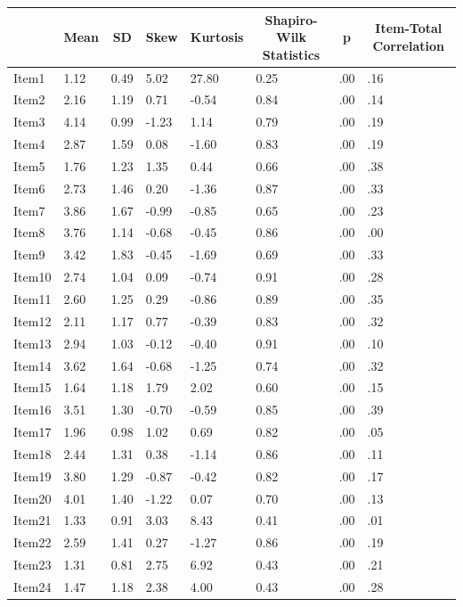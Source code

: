 \documentclass[
  english,
  man]{apa6}
\begin{document}
\begin{table}[tbp]
\begin{center}
\begin{threeparttable}
\begin{tabular}{llllllll}
\toprule
 & \multicolumn{1}{c}{Mean} & \multicolumn{1}{c}{SD} & \multicolumn{1}{c}{Skew} & \multicolumn{1}{c}{Kurtosis} & \multicolumn{1}{c}{Shapiro-Wilk Statistics} & \multicolumn{1}{c}{p} & \multicolumn{1}{c}{Item-Total Correlation}\\
\midrule
Item1 & 1.12 & 0.49 & 5.02 & 27.80 & 0.25 & .00 & .16\\
Item2 & 2.16 & 1.19 & 0.71 & -0.54 & 0.84 & .00 & .14\\
Item3 & 4.14 & 0.99 & -1.23 & 1.14 & 0.79 & .00 & .19\\
Item4 & 2.87 & 1.59 & 0.08 & -1.60 & 0.83 & .00 & .19\\
Item5 & 1.76 & 1.23 & 1.35 & 0.44 & 0.66 & .00 & .38\\
Item6 & 2.73 & 1.46 & 0.20 & -1.36 & 0.87 & .00 & .33\\
Item7 & 3.86 & 1.67 & -0.99 & -0.85 & 0.65 & .00 & .23\\
Item8 & 3.76 & 1.14 & -0.68 & -0.45 & 0.86 & .00 & .00\\
Item9 & 3.42 & 1.83 & -0.45 & -1.69 & 0.69 & .00 & .33\\
Item10 & 2.74 & 1.04 & 0.09 & -0.74 & 0.91 & .00 & .28\\
Item11 & 2.60 & 1.25 & 0.29 & -0.86 & 0.89 & .00 & .35\\
Item12 & 2.11 & 1.17 & 0.77 & -0.39 & 0.83 & .00 & .32\\
Item13 & 2.94 & 1.03 & -0.12 & -0.40 & 0.91 & .00 & .10\\
Item14 & 3.62 & 1.64 & -0.68 & -1.25 & 0.74 & .00 & .32\\
Item15 & 1.64 & 1.18 & 1.79 & 2.02 & 0.60 & .00 & .15\\
Item16 & 3.51 & 1.30 & -0.70 & -0.59 & 0.85 & .00 & .39\\
Item17 & 1.96 & 0.98 & 1.02 & 0.69 & 0.82 & .00 & .05\\
Item18 & 2.44 & 1.31 & 0.38 & -1.14 & 0.86 & .00 & .11\\
Item19 & 3.80 & 1.29 & -0.87 & -0.42 & 0.82 & .00 & .17\\
Item20 & 4.01 & 1.40 & -1.22 & 0.07 & 0.70 & .00 & .13\\
Item21 & 1.33 & 0.91 & 3.03 & 8.43 & 0.41 & .00 & .01\\
Item22 & 2.59 & 1.41 & 0.27 & -1.27 & 0.86 & .00 & .19\\
Item23 & 1.31 & 0.81 & 2.75 & 6.92 & 0.43 & .00 & .21\\
Item24 & 1.47 & 1.18 & 2.38 & 4.00 & 0.43 & .00 & .28\\

\end{tabular}
\end{threeparttable}
\end{center}
\end{table}
\end{document}
